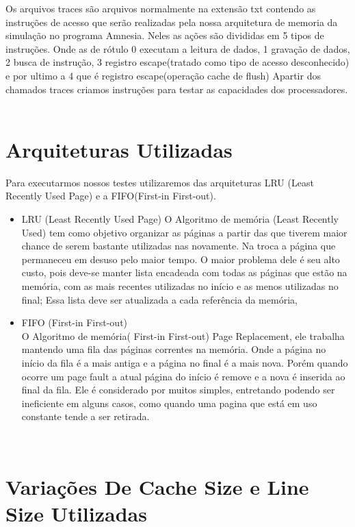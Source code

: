 \documentclass[conference]{IEEEtran}
\begin{document}
\begin{itemize}
Os arquivos traces são  arquivos normalmente na extensão txt contendo as instruções de acesso que serão realizadas pela nossa arquitetura de memoria da simulação no programa Amnesia. Neles as ações são divididas em 5 tipos de instruções. Onde as de rótulo 0 executam a leitura de dados, 1 gravação de dados, 2 busca de instrução, 3 registro escape(tratado como tipo de acesso desconhecido) e por ultimo a 4 que é registro escape(operação cache de flush)
Apartir dos chamados traces criamos instruções para testar as capacidades dos processadores.
\

\end{itemize}

\section{Arquiteturas Utilizadas}
 Para executarmos nossos testes utilizaremos das arquiteturas LRU (Least Recently Used Page) e a FIFO(First-in First-out).
\\
\begin{itemize}
\item LRU (Least Recently Used Page)
O Algoritmo de memória (Least Recently Used) tem como objetivo organizar as páginas a partir das que tiverem maior chance de serem bastante utilizadas nas novamente. Na troca a página que permaneceu em desuso pelo maior tempo.  O maior problema dele é seu alto custo, pois deve-se manter lista encadeada com todas as páginas que estão na memória, com as mais recentes utilizadas no início e as menos utilizadas no final; Essa lista deve ser atualizada a cada referência da memória,
\\
\item FIFO (First-in First-out)
\\
O Algoritmo de memória( First-in First-out) Page Replacement, ele trabalha mantendo uma fila das páginas correntes na memória. Onde a página no início da fila é a mais antiga e a página no final é a mais nova. Porém quando ocorre um page fault a atual página do início é remove e a nova é inserida ao final da fila. Ele é considerado por muitos simples, entretando podendo ser ineficiente em alguns casos, como quando uma pagina que está em uso constante tende a ser retirada.

\end{itemize}
\\

\section{Variações De Cache Size e Line Size Utilizadas}
\end{document}

